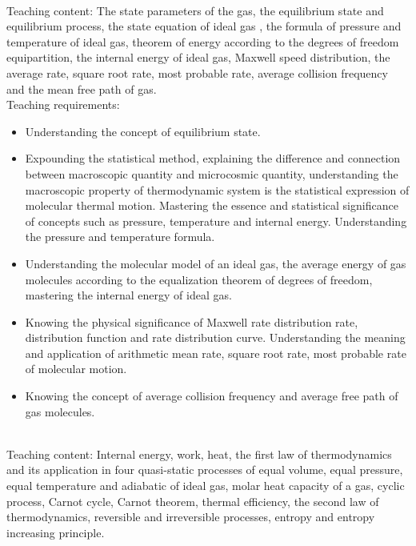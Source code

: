\documentclass[10pt,a4paper,oneside]{article}
\begin{document}
\\

Teaching content: The state parameters of the gas, the equilibrium state and equilibrium process, the state equation of ideal gas , the formula of pressure and temperature of ideal gas, theorem of energy according to the degrees of freedom equipartition, the internal energy of ideal gas, Maxwell speed distribution, the average rate, square root rate, most probable rate, average collision frequency and the mean free path of gas.\\

Teaching requirements:
\begin{itemize}
	\item Understanding the concept of equilibrium state.
	\item Expounding the statistical method, explaining the difference and connection between macroscopic quantity and microcosmic quantity, understanding the macroscopic property of thermodynamic system is the statistical expression of molecular thermal motion. Mastering the essence and statistical significance of concepts such as pressure, temperature and internal energy. Understanding the pressure and temperature formula.
	\item  Understanding the molecular model of an ideal gas, the average energy of gas molecules according to the equalization theorem of degrees of freedom, mastering the internal energy of ideal gas.
	\item Knowing the physical significance of Maxwell rate distribution rate, distribution function and rate distribution curve. Understanding the meaning and application of arithmetic mean rate, square root rate, most probable rate of molecular motion.
	\item Knowing the concept of average collision frequency and average free path of gas molecules.
\end{itemize}
\\

Teaching content: Internal energy, work, heat, the first law of thermodynamics and its application in four quasi-static processes of equal volume, equal pressure, equal temperature and adiabatic of ideal gas, molar heat capacity of a gas, cyclic process, Carnot cycle, Carnot theorem, thermal efficiency, the second law of thermodynamics, reversible and irreversible processes, entropy and entropy increasing principle.\\
\end{document}
